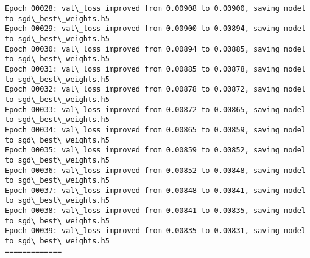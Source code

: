\documentclass[11pt]{article}
\begin{document}
\begin{Verbatim}[commandchars=\\\{\}]
Epoch 00028: val\_loss improved from 0.00908 to 0.00900, saving model to sgd\_best\_weights.h5
Epoch 00029: val\_loss improved from 0.00900 to 0.00894, saving model to sgd\_best\_weights.h5
Epoch 00030: val\_loss improved from 0.00894 to 0.00885, saving model to sgd\_best\_weights.h5
Epoch 00031: val\_loss improved from 0.00885 to 0.00878, saving model to sgd\_best\_weights.h5
Epoch 00032: val\_loss improved from 0.00878 to 0.00872, saving model to sgd\_best\_weights.h5
Epoch 00033: val\_loss improved from 0.00872 to 0.00865, saving model to sgd\_best\_weights.h5
Epoch 00034: val\_loss improved from 0.00865 to 0.00859, saving model to sgd\_best\_weights.h5
Epoch 00035: val\_loss improved from 0.00859 to 0.00852, saving model to sgd\_best\_weights.h5
Epoch 00036: val\_loss improved from 0.00852 to 0.00848, saving model to sgd\_best\_weights.h5
Epoch 00037: val\_loss improved from 0.00848 to 0.00841, saving model to sgd\_best\_weights.h5
Epoch 00038: val\_loss improved from 0.00841 to 0.00835, saving model to sgd\_best\_weights.h5
Epoch 00039: val\_loss improved from 0.00835 to 0.00831, saving model to sgd\_best\_weights.h5
=============


\end{Verbatim}
\end{document}
